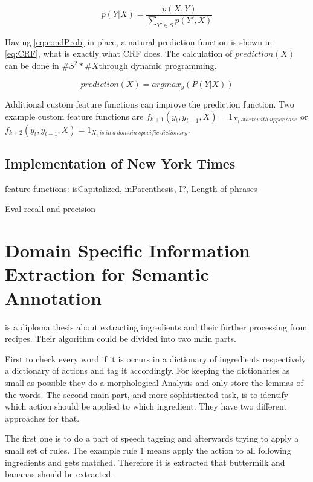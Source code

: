 \documentclass[12pt, twoside]{report}
\begin{document}
\begin{equation}\label{eq:condProb}
p(Y|X) = \frac{p(X,Y)}{\sum_{Y'\in S}^{}p(Y', X)}
\end{equation}

Having \cref{eq:condProb} in place, a natural prediction function is shown in \cref{eq:CRF}, what is exactly what CRF does. The calculation of $prediction(X)$ can be done in $\#S^2*\#X$through dynamic programming.

\begin{equation}\label{eq:CRF}
prediction(X) = argmax_y(P(Y|X))
\end{equation}

Additional custom feature functions can improve the prediction function. Two example custom feature functions are $f_{k+1}(y_t, y_{t-1}, X) = 1_{X_t\ starts with\ upper\ case}$ or \\ $f_{k+2}(y_t, y_{t-1}, X) = 1_{X_t\ is\ in\ a\ domain\ specific\ dictionary}$.

\subsection{Implementation of New York Times}
feature functions: isCapitalized, inParenthesis, I?, Length of phrases

Eval recall and precision
 
\section{Domain Specific Information Extraction for Semantic Annotation}
\parencite{GrammaBased} is a diploma thesis about extracting ingredients and their further processing from recipes. Their algorithm could be divided into two main parts.

First to check every word if it is occurs in a dictionary of ingredients respectively a dictionary of actions and tag it accordingly. For keeping the dictionaries as small as possible they do a morphological Analysis and only store the lemmas of the words. The second main part, and more sophisticated task, is to identify which action should be applied to which ingredient. They have two different approaches for that.

The first one is to do a part of speech tagging and afterwards trying to apply a small set of rules. The example rule 1 means apply the action to all following ingredients and gets matched. Therefore it is extracted that buttermilk and bananas should be extracted.
\end{document}
